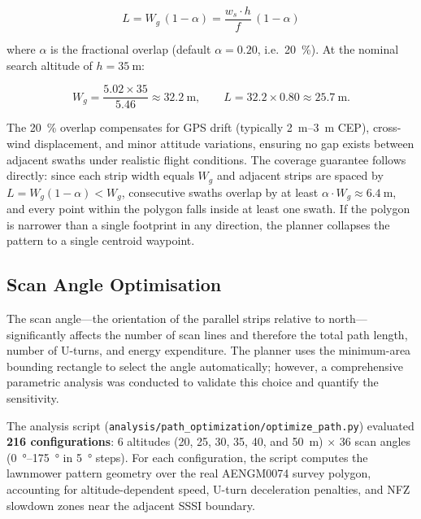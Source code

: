 \begin{equation}\label{eq:lane-width}
  L = W_g \,(1 - \alpha) = \frac{w_s \cdot h}{f}\,(1 - \alpha)
\end{equation}

\noindent where $\alpha$ is the fractional overlap (default $\alpha = 0.20$, i.e.\ \SI{20}{\percent}). At the nominal search altitude of $h = \SI{35}{\metre}$:

\[
  W_g = \frac{5.02 \times 35}{5.46} \approx \SI{32.2}{\metre}, \qquad
  L = 32.2 \times 0.80 \approx \SI{25.7}{\metre}.
\]

The \SI{20}{\percent} overlap compensates for GPS drift (typically \SIrange{2}{3}{\metre} CEP), cross-wind displacement, and minor attitude variations, ensuring no gap exists between adjacent swaths under realistic flight conditions. The coverage guarantee follows directly: since each strip width equals $W_g$ and adjacent strips are spaced by $L = W_g(1-\alpha) < W_g$, consecutive swaths overlap by at least $\alpha \cdot W_g \approx \SI{6.4}{\metre}$, and every point within the polygon falls inside at least one swath. If the polygon is narrower than a single footprint in any direction, the planner collapses the pattern to a single centroid waypoint.

\subsection{Scan Angle Optimisation}\label{sec:scan-angle}

The scan angle---the orientation of the parallel strips relative to north---significantly affects the number of scan lines and therefore the total path length, number of U-turns, and energy expenditure. The planner uses the minimum-area bounding rectangle to select the angle automatically; however, a comprehensive parametric analysis was conducted to validate this choice and quantify the sensitivity.

The analysis script (\texttt{analysis/path\_optimization/optimize\_path.py}) evaluated \textbf{216 configurations}: 6 altitudes (20, 25, 30, 35, 40, and \SI{50}{\metre}) $\times$ 36 scan angles (\SIrange{0}{175}{\degree} in \SI{5}{\degree} steps). For each configuration, the script computes the lawnmower pattern geometry over the real AENGM0074 survey polygon, accounting for altitude-dependent speed, U-turn deceleration penalties, and NFZ slowdown zones near the adjacent SSSI boundary.

